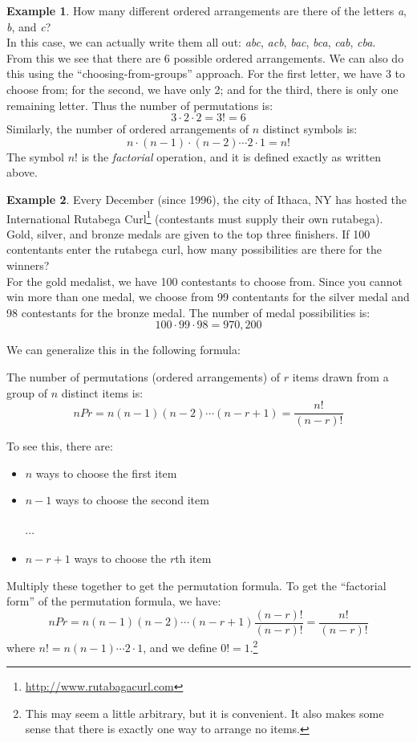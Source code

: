 \documentclass[12pt]{article}
\theoremstyle{definition}
\newtheorem*{example}{Example}
\theoremstyle{remark}
\begin{document}
\begin{example}How many different ordered arrangements are there of the letters \emph{a}, \emph{b}, and \emph{c}? \\

In this case, we can actually write them all out: \emph{abc}, \emph{acb}, \emph{bac}, \emph{bca}, \emph{cab}, \emph{cba}.\\
From this we see that there are 6 possible ordered arrangements. We can also do this using the ``choosing-from-groups'' approach. For the first letter, we have 3 to choose from; for the second, we have only 2; and for the third, there is only one remaining letter. Thus the number of permutations is:
\[
3 \cdot 2 \cdot 2 = 3! = 6
\]
Similarly, the number of ordered arrangements of $n$ distinct symbols is:
\[
n \cdot (n-1) \cdot (n-2) \cdots 2 \cdot 1 = n!
\]
The symbol $n!$ is the \emph{factorial} operation, and it is defined exactly as written above.
\end{example}

\begin{example}Every December (since 1996), the city of Ithaca, NY has hosted the International Rutabega Curl\footnote{\url{http://www.rutabagacurl.com}} (contestants must supply their own rutabega). Gold, silver, and bronze medals are given to the top three finishers. If 100 contentants enter the rutabega curl, how many possibilities are there for the winners?\\

For the gold medalist, we have 100 contestants to choose from. Since you cannot win more than one medal, we choose from 99 contentants for the silver medal and 98 contestants for the bronze medal. The number of medal possibilities is:
\[
100 \cdot 99 \cdot 98 = 970,200
\]
\end{example}

We can generalize this in the following formula:

\begin{framed}
The number of permutations (ordered arrangements) of $r$ items drawn from a group of $n$ distinct items is:
\[
nPr = n (n-1)(n-2)\cdots(n - r + 1) = \frac{n!}{(n-r)!}
\]
\end{framed}
To see this, there are:
\begin{itemize}
\item $n$ ways to choose the first item
\item $n-1$ ways to choose the second item\\ \\$\cdots$
\item $n - r + 1$ ways to choose the $r$th item
\end{itemize}
Multiply these together to get the permutation formula. To get the ``factorial form'' of the permutation formula, we have:
\[
nPr = n (n-1)(n-2)\cdots(n - r + 1)\frac{(n-r)!}{(n-r)!} = \frac{n!}{(n-r)!}
\]
where $n! = n(n-1)\cdots2\cdot1$, and we define $0! = 1.$\footnote{This may seem a little arbitrary, but it is convenient. It also makes some sense that there is exactly one way to arrange no items.}
\end{document}
